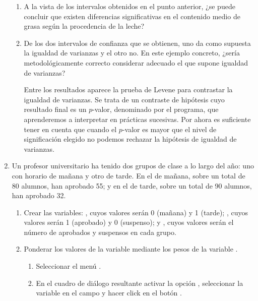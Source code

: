 \begin{enumerate}[leftmargin=*]
\begin{enumerate}
\item A la vista de los intervalos obtenidos en el punto anterior, ¿se puede concluir que existen diferencias
significativas en el contenido medio de grasa según la procedencia de la leche?

\item De los dos intervalos de confianza que se obtienen, uno da como supuesta la igualdad de varianzas y el otro no. En
este ejemplo concreto, ¿sería metodológicamente correcto considerar adecuado el que supone igualdad de varianzas?
\begin{indicacion} 
Entre los resultados aparece la prueba de Levene para contrastar la igualdad de varianzas. Se trata de
un contraste de hipótesis cuyo resultado final es un $p$-valor, denominado  por el programa, que
aprenderemos a interpretar en prácticas sucesivas. Por ahora es suficiente tener en cuenta que cuando el $p$-valor es
mayor que el nivel de significación elegido no podemos rechazar la hipótesis de igualdad de varianzas.
\end{indicacion}
\end{enumerate}

\item Un profesor universitario ha tenido dos grupos de clase a lo largo del año: uno con horario de mañana y otro de
tarde. En el de mañana, sobre un total de 80 alumnos, han aprobado 55; y en el de tarde, sobre un total de 90 alumnos,
han aprobado 32.
\begin{enumerate}
\item Crear las variables: , cuyos valores serán 0 (mañana) y 1 (tarde); , cuyos
valores serán 1 (aprobado) y 0 (suspenso); y , cuyos valores serán el número de aprobados y
suspensos en cada grupo.

\item Ponderar los valores de la variable  mediante los pesos de la variable .
\begin{indicacion}
\begin{enumerate}
\item Seleccionar el menú .
\item En el cuadro de diálogo resultante activar la opción , seleccionar la variable
 en el campo  y hacer click en el botón .
\end{enumerate}
\end{indicacion}


\end{enumerate}
\end{enumerate}
